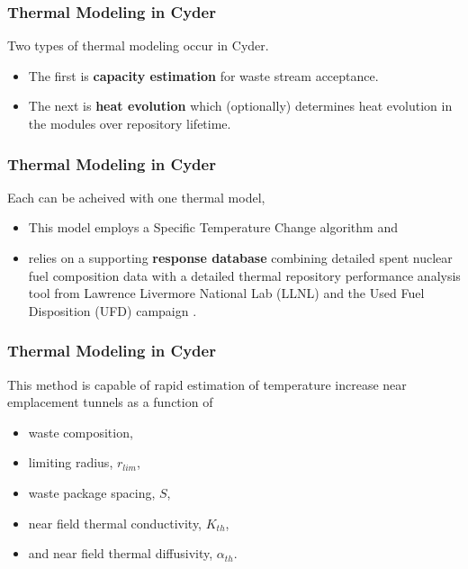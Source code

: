 \begin{frame}[ctb!]
\frametitle{Thermal Modeling in Cyder}
Two types of thermal modeling occur in Cyder. 
\begin{itemize}
\item The first is \textbf{capacity estimation} for waste stream acceptance.
\item The next is \textbf{heat evolution} which (optionally) determines heat evolution in 
the modules over repository lifetime.
\end{itemize}
\end{frame}

\begin{frame}
\frametitle{Thermal Modeling in Cyder}
Each can be acheived with one thermal model,
\begin{itemize}
\item This model employs a Specific Temperature Change algorithm \cite{radel_effect_2007, radel_repository_2007} and
\item relies on a supporting \textbf{response database} combining detailed 
spent nuclear fuel composition data \cite{carter_fuel_2011} with a detailed 
thermal repository performance analysis tool from Lawrence Livermore National 
Lab (LLNL) and the Used Fuel Disposition (UFD) 
campaign \cite{greenberg_application_2012}.  
\end{itemize}
\end{frame}
\begin{frame}
\frametitle{Thermal Modeling in Cyder}
This method is capable of rapid estimation of temperature increase near emplacement tunnels as a function of 
\begin{itemize}
\item waste composition,
\item limiting radius, $r_{lim}$, 
\item waste package spacing, $S$, 
\item near field thermal conductivity, $K_{th}$, 
\item and near field thermal diffusivity, $\alpha_{th}$.
\end{itemize}
\end{frame}




